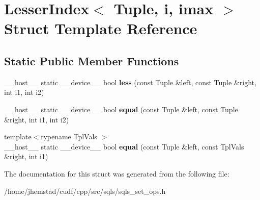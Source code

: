 \hypertarget{structLesserIndex}{}\section{Lesser\+Index$<$ Tuple, i, imax $>$ Struct Template Reference}
\label{structLesserIndex}
\subsection*{Static Public Member Functions}
\begin{DoxyCompactItemize}
\item 
\+\_\+\+\_\+host\+\_\+\+\_\+ static \+\_\+\+\_\+device\+\_\+\+\_\+ bool {\bfseries less} (const Tuple \&left, const Tuple \&right, int i1, int i2)\hypertarget{structLesserIndex_a7be400d90d3a4d032e096c4925cd6ee7}{}\label{structLesserIndex_a7be400d90d3a4d032e096c4925cd6ee7}

\item 
\+\_\+\+\_\+host\+\_\+\+\_\+ static \+\_\+\+\_\+device\+\_\+\+\_\+ bool {\bfseries equal} (const Tuple \&left, const Tuple \&right, int i1, int i2)\hypertarget{structLesserIndex_afe3772e5e49108d209e49956f73ce229}{}\label{structLesserIndex_afe3772e5e49108d209e49956f73ce229}

\item 
{\footnotesize template$<$typename Tpl\+Vals $>$ }\\\+\_\+\+\_\+host\+\_\+\+\_\+ static \+\_\+\+\_\+device\+\_\+\+\_\+ bool {\bfseries equal} (const Tuple \&left, const Tpl\+Vals \&right, int i1)\hypertarget{structLesserIndex_a82b24d5e460e99d8ef45882dad80ea96}{}\label{structLesserIndex_a82b24d5e460e99d8ef45882dad80ea96}

\end{DoxyCompactItemize}


The documentation for this struct was generated from the following file\+:\begin{DoxyCompactItemize}
\item 
/home/jhemstad/cudf/cpp/src/sqls/sqls\+\_\+set\+\_\+ops.\+h\end{DoxyCompactItemize}
